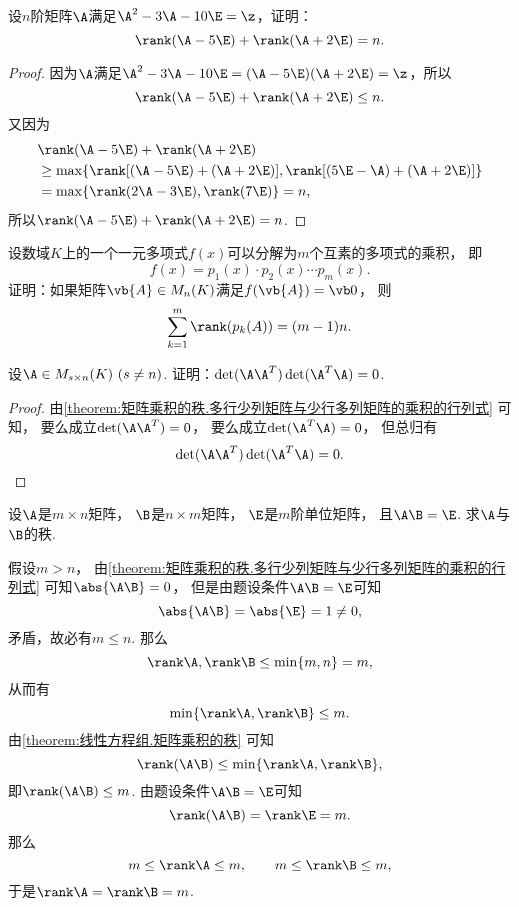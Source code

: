 \begin{example}\label{example:矩阵乘积的秩.矩阵的多项式的各个互素因式的秩之和}
设\(n\)阶矩阵\(\A\)满足\(\A^2 - 3 \A - 10 \E = \z\)，证明：\[
	\rank(\A - 5\E) + \rank(\A + 2\E) = n.
\]
\begin{proof}
因为\(\A\)满足\(\A^2 - 3 \A - 10 \E = (\A - 5\E)(\A + 2\E) = \z\)，所以\[
	\rank(\A - 5\E) + \rank(\A + 2\E) \leq n.
\]
又因为\begin{align*}
	&\rank(\A - 5\E) + \rank(\A + 2\E) \\
	&\geq \max\{
		\rank[(\A - 5\E) + (\A + 2\E)],
		\rank[(5\E - \A) + (\A + 2\E)]
		\} \\
	&= \max\{ \rank(2\A - 3\E),\rank(7\E) \}
	= n,
\end{align*}
所以\(\rank(\A - 5\E) + \rank(\A + 2\E) = n\).
\end{proof}
\end{example}
\begin{example}
设数域\(K\)上的一个一元多项式\(f(x)\)可以分解为\(m\)个互素的多项式的乘积，
即\[
	f(x) = p_1(x) \cdot p_2(x) \dotsm p_m(x).
\]
证明：如果矩阵\(\vb{A} \in M_n(K)\)满足\(f(\vb{A}) = \vb0\)，
则\[
	\sum_{k=1}^m \rank(p_k(A))
	= (m-1)n.
\]
\end{example}

\begin{example}
设\(\A \in M_{s \times n}(K)\ (s \neq n)\).
证明：\(\det(\A \A^T) \det(\A^T \A) = 0\).
\begin{proof}
由\cref{theorem:矩阵乘积的秩.多行少列矩阵与少行多列矩阵的乘积的行列式} 可知，
要么成立\(\det(\A \A^T) = 0\)，
要么成立\(\det(\A^T \A) = 0\)，
但总归有\[
	\det(\A \A^T) \det(\A^T \A) = 0.
	\qedhere
\]
\end{proof}
\end{example}

\begin{example}
设\(\A\)是\(m \times n\)矩阵，
\(\B\)是\(n \times m\)矩阵，
\(\E\)是\(m\)阶单位矩阵，
且\(\A \B = \E\).
求\(\A\)与\(\B\)的秩.
\begin{solution}
假设\(m > n\)，
由\cref{theorem:矩阵乘积的秩.多行少列矩阵与少行多列矩阵的乘积的行列式}
可知\(\abs{\A \B} = 0\)，
但是由题设条件\(\A \B = \E\)可知\[
	\abs{\A \B} = \abs{\E} = 1 \neq 0,
\]
矛盾，故必有\(m \leq n\).
那么\[
	\rank\A,\rank\B \leq \min\{m,n\} = m,
\]
从而有\[
	\min\{\rank\A,\rank\B\} \leq m.
\]
由\cref{theorem:线性方程组.矩阵乘积的秩} 可知\[
	\rank(\A \B) \leq \min\{\rank\A,\rank\B\},
\]
即\(\rank(\A \B) \leq m\).
由题设条件\(\A \B = \E\)可知\[
	\rank(\A \B) = \rank\E = m.
\]
那么\[
	m \leq \rank\A \leq m,
	\qquad
	m \leq \rank\B \leq m,
\]
于是\(\rank\A = \rank\B = m\).
\end{solution}
\end{example}

